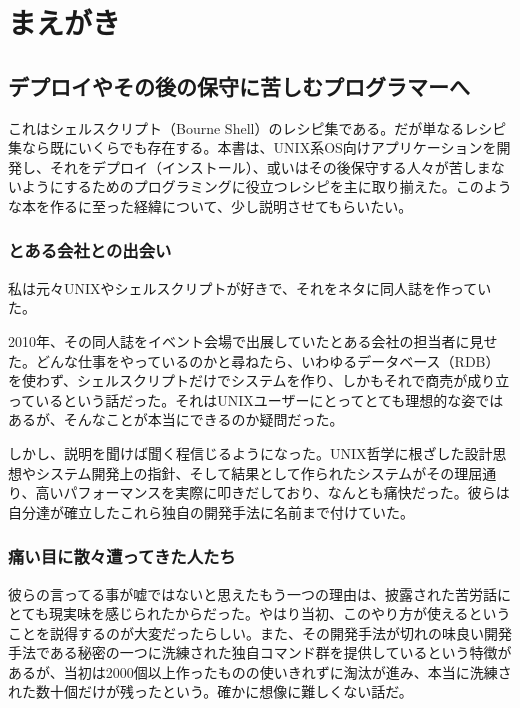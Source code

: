 \chapter{まえがき}

\section*{デプロイやその後の保守に苦しむプログラマーへ}

これはシェルスクリプト（Bourne Shell）のレシピ集である。だが単なるレシピ集なら既にいくらでも存在する。本書は、UNIX系OS向けアプリケーションを開発し、それをデプロイ（インストール）、或いはその後保守する人々が苦しまないようにするためのプログラミングに役立つレシピを主に取り揃えた。このような本を作るに至った経緯について、少し説明させてもらいたい。

\subsection*{とある会社との出会い}

私は元々UNIXやシェルスクリプトが好きで、それをネタに同人誌を作っていた。

2010年、その同人誌をイベント会場で出展していたとある会社の担当者に見せた。どんな仕事をやっているのかと尋ねたら、いわゆるデータベース（RDB）を使わず、シェルスクリプトだけでシステムを作り、しかもそれで商売が成り立っているという話だった。それはUNIXユーザーにとってとても理想的な姿ではあるが、そんなことが本当にできるのか疑問だった。

しかし、説明を聞けば聞く程信じるようになった。UNIX哲学に根ざした設計思想やシステム開発上の指針、そして結果として作られたシステムがその理屈通り、高いパフォーマンスを実際に叩きだしており、なんとも痛快だった。彼らは自分達が確立したこれら独自の開発手法に名前まで付けていた。

\subsection*{痛い目に散々遭ってきた人たち}

彼らの言ってる事が嘘ではないと思えたもう一つの理由は、披露された苦労話にとても現実味を感じられたからだった。やはり当初、このやり方が使えるということを説得するのが大変だったらしい。また、その開発手法が切れの味良い開発手法である秘密の一つに洗練された独自コマンド群を提供しているという特徴があるが、当初は2000個以上作ったものの使いきれずに淘汰が進み、本当に洗練された数十個だけが残ったという。確かに想像に難しくない話だ。


